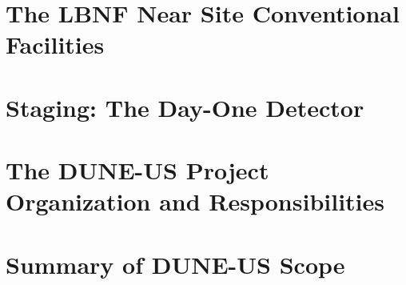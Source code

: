 \section{The LBNF Near Site Conventional Facilities}
\label{intro:lbnf}



\section{Staging: The Day-One Detector}
\label{intro:staging}



\section{The DUNE-US Project Organization and Responsibilities}
\label{intro:collab-proj}



\section{Summary of DUNE-US Scope}
\label{intro:us-scope}
